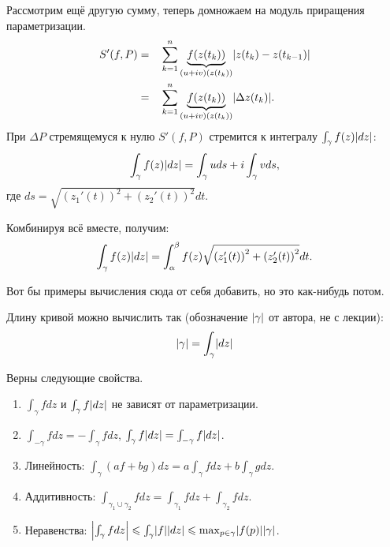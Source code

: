 Рассмотрим ещё другую сумму, теперь домножаем на модуль приращения параметризации.
\[
	\begin{aligned}
		S'(f, P) = & && \sum_{k = 1}^n \underbrace{f(z(t_k))}_{(u+iv)(z(t_k))} \mathopen{}\left\lvert z(t_k) - z(t_{k - 1})\right\rvert\mathclose{}\\
		= & && \sum_{k = 1}^n \underbrace{f(z(t_k))}_{(u+iv)(z(t_k))} \mathopen{}\left\lvert\Delta z(t_k)\right\rvert\mathclose{}.
	\end{aligned}
\]
При $\Delta P$ стремящемуся к нулю $S'(f, P)$ стремится к интегралу $\int_\gamma f(z) \mathopen{}\left\lvert dz\right\rvert\mathclose{}$:
\[
	\int_\gamma f(z) \mathopen{}\left\lvert dz\right\rvert\mathclose{} = \int_\gamma u ds + i \int_\gamma v ds,
\]
где $ds = \sqrt{{(z_1'(t))}^2 + {(z_2'(t))}^2} dt$.

\begin{anote}
	Комбинируя всё вместе, получим:
	\[
		\int_\gamma f(z) \mathopen{}\left\lvert dz\right\rvert\mathclose{} = \int_\alpha^\beta f(z) \sqrt{{(z_1'(t))}^2 + {(z_2'(t))}^2} dt.
	\]
\end{anote}

{\color{red} Вот бы примеры вычисления сюда от себя добавить, но это как-нибудь потом.}

\begin{note}
	Длину кривой можно вычислить так (обозначение $\mathopen{}\left\lvert\gamma\right\rvert\mathclose{}$ от автора, не с лекции):
	\[
		\mathopen{}\left\lvert\gamma\right\rvert\mathclose{} = \int_\gamma \mathopen{}\left\lvert dz\right\rvert\mathclose{}
	\]
\end{note}
\begin{theorem}
	Верны следующие свойства.
	\begin{enumerate}
		\item $\int_\gamma f dz$ и $\int_\gamma f \mathopen{}\left\lvert dz\right\rvert\mathclose{}$ не зависят от параметризации.
		\item $\int_{-\gamma} f dz = - \int_{\gamma} f dz$, $\int_\gamma f \mathopen{}\left\lvert dz\right\rvert\mathclose{} = \int_{-\gamma} f \mathopen{}\left\lvert dz\right\rvert\mathclose{}$.
		\item Линейность: $\int_\gamma (af + bg) dz = a \int_\gamma f dz + b \int_\gamma g dz$.
		\item Аддитивность: $\int_{\gamma_1 \cup \gamma_2} f dz = \int_{\gamma_1} f dz + \int_{\gamma_2} f dz$.
		\item Неравенства: $\mathopen{}\left\lvert\int_\gamma f dz\right\rvert\mathclose{} \leqslant \int_\gamma \mathopen{}\left\lvert f\right\rvert\mathclose{} \mathopen{}\left\lvert dz\right\rvert\mathclose{} \leqslant \max_{p \in \gamma} \mathopen{}\left\lvert f(p)\right\rvert\mathclose{} \mathopen{}\left\lvert\gamma\right\rvert\mathclose{}$.
	\end{enumerate}
\end{theorem}

